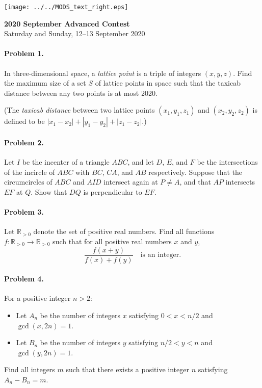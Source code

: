 \documentclass[12pt]{article}
\newcommand*{\currpos}[1]{%
  \zsavepos{#1}%
}
\begin{document}
		\begin{flushleft}
		\texttt{[image: ../../MODS\_text\_right.eps]}\\
		\end{flushleft}
		\vspace{15pt}
		\noindent \LARGE\textbf{2020 September Advanced Contest}\\[10pt]
		\noindent \normalsize{Saturday and Sunday, 12--13 September 2020}\\
		\noindent \makebox[\linewidth]{\rule{\textwidth}{0.4pt}}
			
	\normalsize
	
	\paragraph{\currpos{one}Problem 1.} In three-dimensional space, a \emph{lattice point} is a triple of integers \((x, y, z)\). Find the maximum size of a set \(S\) of lattice points in space such that the taxicab distance between any two points is at most 2020.
	
	(The \emph{taxicab distance} between two lattice points \(\left(x_1, y_1, z_1\right)\) and \((x_2, y_2, z_2)\) is defined to be \(\left \lvert x_1 - x_2 \right \rvert + \left \lvert y_1 - y_2 \right \rvert + \left \lvert z_1 - z_2 \right \rvert\).)
	
	\paragraph{\currpos{two}Problem 2.} Let \(I\) be the incenter of a triangle \(ABC\), and let \(D\), \(E\), and \(F\) be the intersections of the incircle of \(ABC\) with \(BC\), \(CA\), and \(AB\) respectively. Suppose that the circumcircles of $ABC$ and $AID$ intersect again at $P \neq A$, and that $AP$ intersects $EF$ at $Q$. Show that \(DQ\) is perpendicular to \(EF\).
	
	\paragraph{\currpos{three}Problem 3.} Let $\mathbb{R}_{>0}$ denote the set of positive real numbers. Find all functions $f:\mathbb{R}_{>0}\to\mathbb{R}_{>0}$ such that for all positive real numbers \(x\) and \(y\), \[\frac{f(x+y)}{f(x)+f(y)} \quad \text{is an integer.}\]
	
	\paragraph{\currpos{four}Problem 4.} For a positive integer $n > 2$:
	\begin{itemize}
		\item Let $A_n$ be the number of integers $x$ satisfying $0 < x < n/2$ and $\gcd(x,2n) = 1$.
		\item Let $B_n$ be the number of integers $y$ satisfying $n/2 < y < n$ and $\gcd(y,2n) = 1$.
	\end{itemize}
	Find all integers $m$ such that there exists a positive integer $n$ satisfying $A_n - B_n = m$.
	
\end{document}

